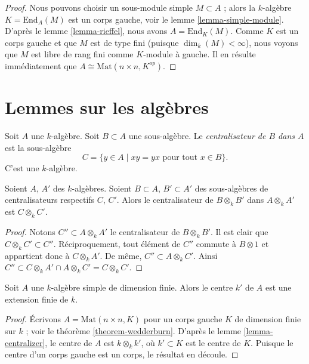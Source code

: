 \begin{proof}
Nous pouvons choisir un sous-module simple $M \subset A$ ; alors
la $k$-algèbre $K = \text{End}_A(M)$ est un corps gauche, voir
le lemme \ref{lemma-simple-module}.
D'après le
lemme \ref{lemma-rieffel},
nous avons $A = \text{End}_K(M)$. Comme $K$ est un corps gauche et que
$M$ est de type fini (puisque $\dim_k(M) < \infty$), nous voyons que
$M$ est libre de rang fini comme $K$-module à gauche. Il en résulte immédiatement que
$A \cong \text{Mat}(n \times n, K^{op})$.
\end{proof}



\section{Lemmes sur les algèbres}
\label{section-lemmas}

\noindent
Soit $A$ une $k$-algèbre. Soit $B \subset A$ une sous-algèbre.
Le {\it centralisateur de $B$ dans $A$} est la sous-algèbre
$$
C  = \{y \in A \mid xy = yx \text{ pour tout }x \in B\}.
$$
C'est une $k$-algèbre.

\begin{lemma}
\label{lemma-centralizer}
Soient $A$, $A'$ des $k$-algèbres. Soient $B \subset A$, $B' \subset A'$ des
sous-algèbres de centralisateurs respectifs $C$, $C'$. Alors le centralisateur de
$B \otimes_k B'$ dans $A \otimes_k A'$ est $C \otimes_k C'$.
\end{lemma}

\begin{proof}
Notons $C'' \subset A \otimes_k A'$ le centralisateur de $B \otimes_k B'$.
Il est clair que $C \otimes_k C' \subset C''$. Réciproquement, tout élément
de $C''$ commute à $B \otimes 1$ et appartient donc à $C \otimes_k A'$.
De même, $C'' \subset A \otimes_k C'$. Ainsi
$C'' \subset C \otimes_k A' \cap A \otimes_k C' = C \otimes_k C'$.
\end{proof}

\begin{lemma}
\label{lemma-center-csa}
Soit $A$ une $k$-algèbre simple de dimension finie. Alors le centre $k'$ de
$A$ est une extension finie de $k$.
\end{lemma}

\begin{proof}
Écrivons $A = \text{Mat}(n \times n, K)$ pour un corps gauche $K$ de
dimension finie sur $k$ ; voir le
théorème \ref{theorem-wedderburn}.
D'après le
lemme \ref{lemma-centralizer},
le centre de $A$ est $k \otimes_k k'$, où $k' \subset K$ est le centre de
$K$. Puisque le centre d'un corps gauche est un corps, le résultat en découle.
\end{proof}


